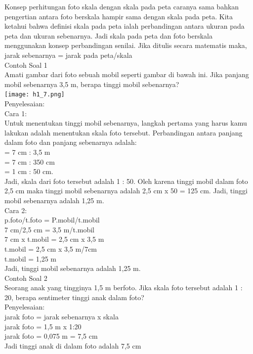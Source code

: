 \documentclass[11pt,fleqn]{book} %
\begin{document}
Konsep perhitungan foto skala dengan skala pada peta caranya sama bahkan pengertian antara foto berskala hampir sama dengan skala pada peta. Kita ketahui bahwa definisi skala pada peta ialah perbandingan antara ukuran pada peta dan ukuran sebenarnya. Jadi skala pada peta dan foto berskala menggunakan konsep perbandingan senilai. Jika ditulis secara matematis maka, jarak sebenarnya = jarak pada peta/skala\\

Contoh Soal 1\\
Amati gambar dari foto sebuah mobil seperti gambar di bawah ini. Jika panjang mobil sebenarnya 3,5 m, berapa tinggi mobil sebenarnya?\\
 \texttt{[image: h1\_7.png]}\\
Penyelesaian:\\
Cara 1:\\
Untuk menentukan tinggi mobil sebenarnya, langkah pertama yang harus kamu lakukan adalah menentukan skala foto tersebut. Perbandingan antara panjang dalam foto dan panjang sebenarnya adalah:\\
= 7 cm : 3,5 m\\
= 7 cm : 350 cm\\
= 1 cm : 50 cm.\\
Jadi, skala dari foto tersebut adalah 1 : 50. Oleh karena tinggi mobil dalam foto 2,5 cm maka tinggi mobil sebenarnya adalah 2,5 cm x 50 = 125 cm. Jadi, tinggi mobil sebenarnya adalah 1,25 m.\\

Cara 2:\\
p.foto/t.foto = P.mobil/t.mobil\\
7 cm/2,5 cm = 3,5 m/t.mobil\\
7 cm x t.mobil = 2,5 cm x 3,5 m\\
t.mobil = 2,5 cm x 3,5 m/7cm\\
t.mobil = 1,25 m\\
Jadi, tinggi mobil sebenarnya adalah 1,25 m.\\

Contoh Soal 2\\
Seorang anak yang tingginya 1,5 m berfoto. Jika skala foto tersebut adalah 1 : 20, berapa sentimeter tinggi anak dalam foto?\\

Penyelesaian:\\
jarak foto = jarak sebenarnya x skala\\
jarak foto = 1,5 m x 1:20\\
jarak foto = 0,075 m = 7,5 cm\\
Jadi tinggi anak di dalam foto adalah 7,5 cm\\
\end{document}

